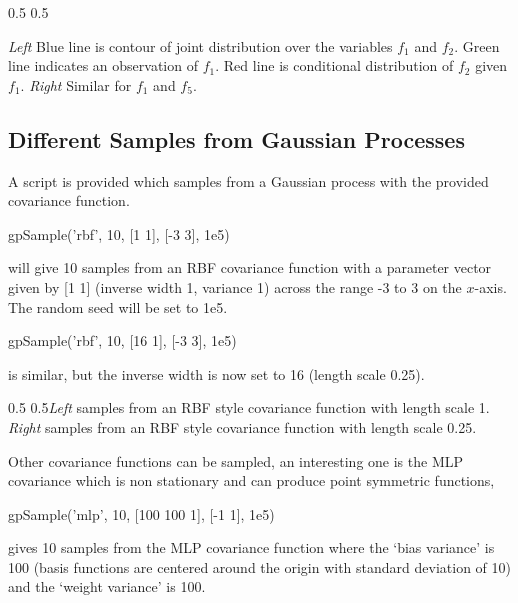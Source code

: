 \begin{center}
 0.5\textwidth {} 0.5\textwidth 

\emph{Left} Blue line is
contour of joint distribution over the variables $f_1$
and $f_2$. Green line indicates an observation of
$f_1$. Red line is conditional distribution of
$f_2$ given $f_1$. \emph{Right} Similar
for $f_1$ and $f_5$.  
\end{center}



\subsection{Different Samples from Gaussian Processes}

A script is provided which samples from a Gaussian process with the
provided covariance function.

\begin{octave}
 gpSample('rbf', 10, [1 1], [-3 3], 1e5)
\end{octave}

will give 10 samples from an RBF covariance function with a
parameter vector given by [1 1] (inverse width 1, variance 1) across
the range -3 to 3 on the $x$-axis. The random seed will be set to
1e5.

\begin{octave}
 gpSample('rbf', 10, [16 1], [-3 3], 1e5)
\end{octave}

is similar, but the inverse width is now set to 16 (length scale 0.25).

\begin{center} 0.5\textwidth {} 0.5\textwidth \emph{Left} samples from an RBF style covariance function
with length scale 1. \emph{Right} samples from an RBF style covariance
function with length scale 0.25.  
\end{center}

Other covariance functions can be sampled, an interesting one is
the MLP covariance which is non stationary and can produce point
symmetric functions,


\begin{octave}
 gpSample('mlp', 10, [100 100 1], [-1 1], 1e5)
\end{octave}

gives 10 samples from the MLP covariance function where the `bias
variance' is 100 (basis functions are centered around the origin
with standard deviation of 10) and the `weight variance' is
100.

